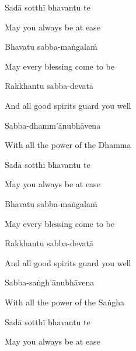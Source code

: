 Sadā sotthī bhavantu te

\begin{english}
  May you always be at ease
\end{english}

\ifbfive\clearpage\fi

Bhavatu sabba-maṅgalaṁ

\begin{english}
  May every blessing come to be
\end{english}

\ifafive
  \clearpage
\fi

Rakkhantu sabba-devatā

\begin{english}
  And all good spirits guard you well
\end{english}

Sabba-dhamm'ānubhāvena

\begin{english}
  With all the power of the Dhamma
\end{english}

Sadā sotthī bhavantu te

\begin{english}
  May you always be at ease
\end{english}

\ifninebythirteen\clearpage\fi

Bhavatu sabba-maṅgalaṁ

\begin{english}
  May every blessing come to be
\end{english}

Rakkhantu sabba-devatā

\begin{english}
  And all good spirits guard you well
\end{english}

Sabba-saṅgh'ānubhāvena

\begin{english}
  With all the power of the Saṅgha
\end{english}

Sadā sotthī bhavantu te

\begin{english}
  May you always be at ease
\end{english}

\suttaRef{[MJG]}

\clearpage



